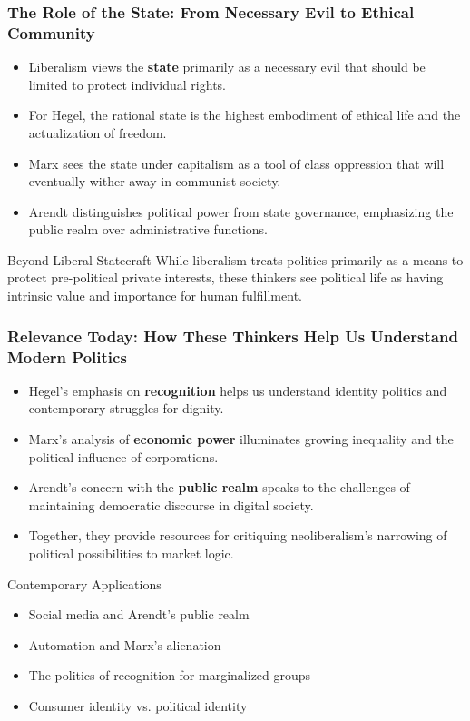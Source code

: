 \documentclass{beamer}
\begin{document}
\begin{frame}
\frametitle{The Role of the State: From Necessary Evil to Ethical Community}
\begin{itemize}
    \item Liberalism views the \textbf{state} primarily as a necessary evil that should be limited to protect individual rights.
    \item For Hegel, the rational state is the highest embodiment of ethical life and the actualization of freedom.
    \item Marx sees the state under capitalism as a tool of class oppression that will eventually wither away in communist society.
    \item Arendt distinguishes political power from state governance, emphasizing the public realm over administrative functions.
\end{itemize}

\begin{block}{Beyond Liberal Statecraft}
While liberalism treats politics primarily as a means to protect pre-political private interests, these thinkers see political life as having intrinsic value and importance for human fulfillment.
\end{block}
\end{frame}

\begin{frame}
\frametitle{Relevance Today: How These Thinkers Help Us Understand Modern Politics}
\begin{itemize}
    \item Hegel's emphasis on \textbf{recognition} helps us understand identity politics and contemporary struggles for dignity.
    \item Marx's analysis of \textbf{economic power} illuminates growing inequality and the political influence of corporations.
    \item Arendt's concern with the \textbf{public realm} speaks to the challenges of maintaining democratic discourse in digital society.
    \item Together, they provide resources for critiquing neoliberalism's narrowing of political possibilities to market logic.
\end{itemize}

\begin{exampleblock}{Contemporary Applications}
\begin{itemize}
    \item Social media and Arendt's public realm
    \item Automation and Marx's alienation
    \item The politics of recognition for marginalized groups
    \item Consumer identity vs. political identity
\end{itemize}
\end{exampleblock}
\end{frame}
\end{document}
